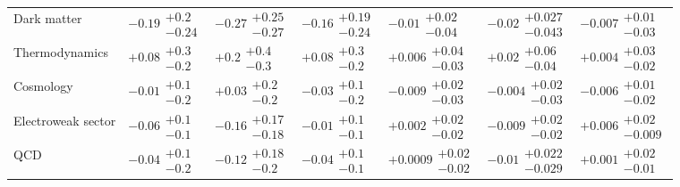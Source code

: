 \begin{tabular}{lllllll}
Dark matter                               &          $-0.19\substack{+0.2 \\ -0.24}$ &    $\bm{-0.27}\substack{+0.25 \\ -0.27}$ &         $-0.16\substack{+0.19 \\ -0.24}$ &         $-0.01\substack{+0.02 \\ -0.04}$ &       $-0.02\substack{+0.027 \\ -0.043}$ &        $-0.007\substack{+0.01 \\ -0.03}$ \\
Thermodynamics                            &           $+0.08\substack{+0.3 \\ -0.2}$ &            $+0.2\substack{+0.4 \\ -0.3}$ &           $+0.08\substack{+0.3 \\ -0.2}$ &        $+0.006\substack{+0.04 \\ -0.03}$ &         $+0.02\substack{+0.06 \\ -0.04}$ &        $+0.004\substack{+0.03 \\ -0.02}$ \\
Cosmology                                 &           $-0.01\substack{+0.1 \\ -0.2}$ &           $+0.03\substack{+0.2 \\ -0.2}$ &           $-0.03\substack{+0.1 \\ -0.2}$ &        $-0.009\substack{+0.02 \\ -0.03}$ &        $-0.004\substack{+0.02 \\ -0.03}$ &        $-0.006\substack{+0.01 \\ -0.02}$ \\
Electroweak sector                        &           $-0.06\substack{+0.1 \\ -0.1}$ &         $-0.16\substack{+0.17 \\ -0.18}$ &           $-0.01\substack{+0.1 \\ -0.1}$ &        $+0.002\substack{+0.02 \\ -0.02}$ &        $-0.009\substack{+0.02 \\ -0.02}$ &       $+0.006\substack{+0.02 \\ -0.009}$ \\
QCD                                       &           $-0.04\substack{+0.1 \\ -0.2}$ &          $-0.12\substack{+0.18 \\ -0.2}$ &           $-0.04\substack{+0.1 \\ -0.1}$ &       $+0.0009\substack{+0.02 \\ -0.02}$ &       $-0.01\substack{+0.022 \\ -0.029}$ &        $+0.001\substack{+0.02 \\ -0.01}$ \\

\end{tabular}

